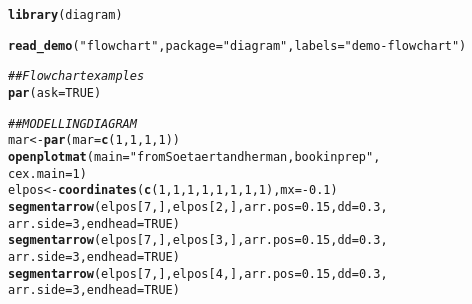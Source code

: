 \documentclass{article}\usepackage[]{graphicx}\usepackage[]{color}
\makeatletter
\newcommand{\hlnum}[1]{\textcolor[rgb]{0.686,0.059,0.569}{#1}}%
\newcommand{\hlstr}[1]{\textcolor[rgb]{0.192,0.494,0.8}{#1}}%
\newcommand{\hlcom}[1]{\textcolor[rgb]{0.678,0.584,0.686}{\textit{#1}}}%
\newcommand{\hlopt}[1]{\textcolor[rgb]{0,0,0}{#1}}%
\newcommand{\hlstd}[1]{\textcolor[rgb]{0.345,0.345,0.345}{#1}}%
\newcommand{\hlkwb}[1]{\textcolor[rgb]{0.69,0.353,0.396}{#1}}%
\newcommand{\hlkwc}[1]{\textcolor[rgb]{0.333,0.667,0.333}{#1}}%
\newcommand{\hlkwd}[1]{\textcolor[rgb]{0.737,0.353,0.396}{\textbf{#1}}}%
\newenvironment{kframe}{%
 \def\at@end@of@kframe{}%
 \ifinner\ifhmode%
  \def\at@end@of@kframe{\end{minipage}}%
  \begin{minipage}{\columnwidth}%
 \fi\fi%
 \def\FrameCommand##1{\hskip\@totalleftmargin \hskip-\fboxsep
 \colorbox{shadecolor}{##1}\hskip-\fboxsep
     \hskip-\linewidth \hskip-\@totalleftmargin \hskip\columnwidth}%
 \MakeFramed {\advance\hsize-\width
   \@totalleftmargin\z@ \linewidth\hsize
   \@setminipage}}%
 {\par\unskip\endMakeFramed%
 \at@end@of@kframe}
\newenvironment{knitrout}{}{} %
\makeatother
\begin{document}
\begin{knitrout}
\color{fgcolor}\begin{kframe}
\begin{alltt}
\hlkwd{library}\hlstd{(diagram)}
\end{alltt}


{\ttfamily\noindent\itshape\color{messagecolor}{\#\# Loading required package: shape}}\begin{alltt}
\hlkwd{read_demo}\hlstd{(}\hlstr{"flowchart"}\hlstd{,} \hlkwc{package} \hlstd{=} \hlstr{"diagram"}\hlstd{,} \hlkwc{labels} \hlstd{=} \hlstr{"demo-flowchart"}\hlstd{)}
\end{alltt}
\end{kframe}
\end{knitrout}
\begin{knitrout}
\color{fgcolor}\begin{kframe}
\begin{alltt}
\hlcom{## Flowchart examples}
\hlkwd{par}\hlstd{(}\hlkwc{ask} \hlstd{=} \hlnum{TRUE}\hlstd{)}

\hlcom{## MODELLING DIAGRAM}
\hlstd{mar} \hlkwb{<-} \hlkwd{par}\hlstd{(}\hlkwc{mar} \hlstd{=} \hlkwd{c}\hlstd{(}\hlnum{1}\hlstd{,} \hlnum{1}\hlstd{,} \hlnum{1}\hlstd{,} \hlnum{1}\hlstd{))}
\hlkwd{openplotmat}\hlstd{(}\hlkwc{main} \hlstd{=} \hlstr{"from Soetaert and herman, book in prep"}\hlstd{,}
    \hlkwc{cex.main} \hlstd{=} \hlnum{1}\hlstd{)}
\hlstd{elpos} \hlkwb{<-} \hlkwd{coordinates}\hlstd{(}\hlkwd{c}\hlstd{(}\hlnum{1}\hlstd{,} \hlnum{1}\hlstd{,} \hlnum{1}\hlstd{,} \hlnum{1}\hlstd{,} \hlnum{1}\hlstd{,} \hlnum{1}\hlstd{,} \hlnum{1}\hlstd{,} \hlnum{1}\hlstd{),} \hlkwc{mx} \hlstd{=} \hlopt{-}\hlnum{0.1}\hlstd{)}
\hlkwd{segmentarrow}\hlstd{(elpos[}\hlnum{7}\hlstd{, ], elpos[}\hlnum{2}\hlstd{, ],} \hlkwc{arr.pos} \hlstd{=} \hlnum{0.15}\hlstd{,} \hlkwc{dd} \hlstd{=} \hlnum{0.3}\hlstd{,}
    \hlkwc{arr.side} \hlstd{=} \hlnum{3}\hlstd{,} \hlkwc{endhead} \hlstd{=} \hlnum{TRUE}\hlstd{)}
\hlkwd{segmentarrow}\hlstd{(elpos[}\hlnum{7}\hlstd{, ], elpos[}\hlnum{3}\hlstd{, ],} \hlkwc{arr.pos} \hlstd{=} \hlnum{0.15}\hlstd{,} \hlkwc{dd} \hlstd{=} \hlnum{0.3}\hlstd{,}
    \hlkwc{arr.side} \hlstd{=} \hlnum{3}\hlstd{,} \hlkwc{endhead} \hlstd{=} \hlnum{TRUE}\hlstd{)}
\hlkwd{segmentarrow}\hlstd{(elpos[}\hlnum{7}\hlstd{, ], elpos[}\hlnum{4}\hlstd{, ],} \hlkwc{arr.pos} \hlstd{=} \hlnum{0.15}\hlstd{,} \hlkwc{dd} \hlstd{=} \hlnum{0.3}\hlstd{,}
    \hlkwc{arr.side} \hlstd{=} \hlnum{3}\hlstd{,} \hlkwc{endhead} \hlstd{=} \hlnum{TRUE}\hlstd{)}


\end{alltt}
\end{kframe}
\end{knitrout}
\end{document}
